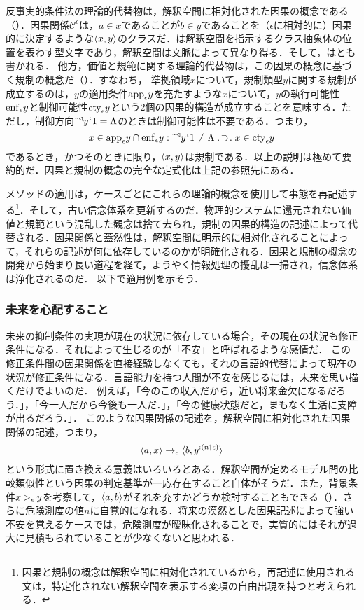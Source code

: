 反事実的条件法の理論的代替物は，解釈空間に相対化された因果の概念である（）．因果関係$\mathcal{C}^\epsilon$は，$ a\in x $であることが$ b\in y $であることを（$\epsilon$に相対的に）因果的に決定するような$\langle x,y \rangle$のクラスだ．\kagi{$ \epsilon $}は解釈空間を指示するクラス抽象体の位置を表わす型文字であり，解釈空間は文脈によって異なり得る．そして，はとも書かれる．
他方，価値と規範に関する理論的代替物は，この因果の概念に基づく規制の概念だ（）．すなわち，
準拠領域$x$について，規制類型$y$に関する規制が成立するのは，$y$の適用条件$ \mathrm{app}_{\epsilon}y $を充たすような$x$について，$y$の執行可能性$\mathrm{enf}_{\epsilon}y$と制御可能性$\mathrm{cty}_{\epsilon}y$という2個の因果的構造が成立することを意味する．ただし，制御方向$\tilde{\:\:}{^\triangleleft}y{\mspace{1mu}{`}\mspace{1mu}} 1 = \Lambda$のときは制御可能性は不要である．つまり，
\[
    x\in\app{\epsilon}y\cap \enf{\epsilon}y\con{2}\tildel{\trgl{y}}\fap 1 \neq \Lambda\case{1}{1}{1}x\in\cty{\epsilon}y
\]
であるとき，かつそのときに限り，$\langle x,y \rangle$は規制である．以上の説明は極めて要約的だ．因果と規制の概念の完全な定式化は上記の参照先にある．

メソッドの適用は，ケースごとにこれらの理論的概念を使用して事態を再記述する\footnote{
    因果と規制の概念は解釈空間に相対化されているから，再記述に使用される文は，特定化されない解釈空間を表示する変項の自由出現を持つと考えられる．
}．そして，古い信念体系を更新するのだ．物理的システムに還元されない価値と規範という混乱した観念は捨て去られ，規制の因果的構造の記述によって代替される．因果関係と蓋然性は，解釈空間に明示的に相対化されることによって，それらの記述が何に依存しているのかが明確化される．因果と規制の概念の開発から始まり長い道程を経て，ようやく情報処理の擾乱は一掃され，信念体系は浄化されるのだ．
以下で適用例を示そう．

\subsubsection{未来を心配すること}
\label{sssec:未来を心配する}

未来の抑制条件の実現が現在の状況に依存している場合，その現在の状況も修正条件になる．それによって生じるのが「不安」と呼ばれるような感情だ．
この修正条件間の因果関係を直接経験しなくても，それの言語的代替によって現在の状況が修正条件になる．言語能力を持つ人間が不安を感じるには，未来を思い描くだけでよいのだ．
例えば，「今のこの収入だから，近い将来金欠になるだろう．」，「今一人だから今後も一人だ．」，「今の健康状態だと，まもなく生活に支障が出るだろう．」．
このような因果関係の記述を，解釈空間に相対化された因果関係の記述，つまり，
\[
   \langle a,x \rangle\to_{\epsilon}\langle b,y^{:(n\mathbin{\upharpoonleft}\epsilon)} \rangle
\]
という形式に置き換える意義はいろいろとある．解釈空間が定めるモデル間の比較類似性という因果の判定基準が一応存在すること自体がそうだ．また，背景条件$ x\mathbin{\vartriangleright_{\epsilon}}y $を考察して，$\langle a,b \rangle$がそれを充すかどうか検討することもできる（）．さらに危険測度の値$n$に自覚的になれる．将来の漠然とした因果記述によって強い不安を覚えるケースでは，危険測度が曖昧化されることで，実質的にはそれが過大に見積もられていることが少なくないと思われる．

